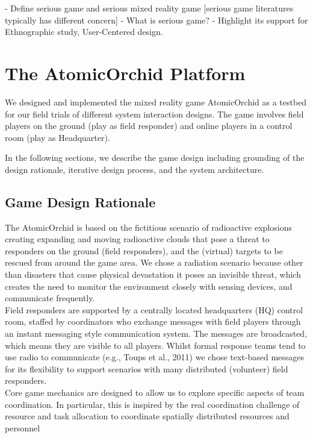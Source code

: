 - Define serious game and serious mixed reality game [serious game literatures typically has different concern]
- What is serious game?
- Highlight its support for Ethnographic study, User-Centered design. 


\section{The AtomicOrchid Platform}
We designed and implemented the mixed reality game AtomicOrchid as a testbed for our field trials of different system interaction designs. The game involves field players on the ground (play as field responder) and online players in a control room (play as Headquarter). 


In the following sections, we describe the game design including grounding of the design rationale,  iterative design process, and the system architecture.

\subsection{Game Design Rationale}
The AtomicOrchid is based on the fictitious scenario of radioactive explosions creating expanding and moving radioactive clouds that pose a threat to responders on the ground (field responders), and the (virtual) targets to be rescued from around the game area. We chose a radiation scenario because other than disasters that cause physical devastation it poses an invisible threat, which creates the need to monitor the environment closely with sensing devices, and communicate frequently.\\

Field responders are supported by a centrally located headquarters (HQ) control room, staffed by coordinators who exchange messages with field players through an instant messaging style communication system. The messages are broadcasted, which means they are visible to all players. Whilst formal response teams tend to use radio to communicate (e.g., Toups et al., 2011) we chose text-based messages for its flexibility to support scenarios with many distributed (volunteer) field responders.\\

Core game mechanics are designed to allow us to explore specific aspects of team coordination. In particular, this is inspired by the real coordination challenge of resource and task allocation to coordinate spatially distributed resources and personnel\\

